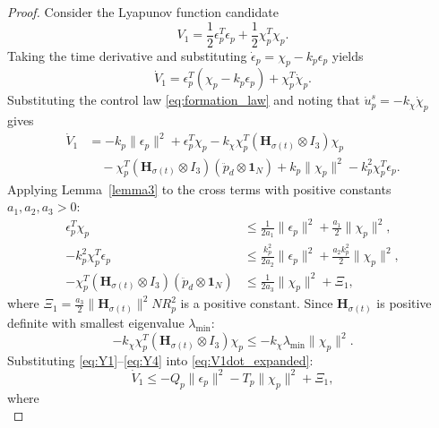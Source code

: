 \begin{proof}
Consider the Lyapunov function candidate
\begin{equation}
    V_1 = \frac{1}{2} \epsilon_p^T \epsilon_p + \frac{1}{2} \chi_p^T \chi_p.
    \label{eq:V1}
\end{equation}
Taking the time derivative and substituting $\dot{\epsilon}_p = \chi_p - k_p
\epsilon_p$ yields
\begin{equation}
    \dot{V}_1 = \epsilon_p^T(\chi_p - k_p \epsilon_p) + \chi_p^T \dot{\chi}_p.
\end{equation}
Substituting the control law \eqref{eq:formation_law} and noting that
$\dot{u}_p^s = -k_\chi \dot{\chi}_p$ gives
\begin{align}
    \dot{V}_1 &= -k_p \|\epsilon_p\|^2 + \epsilon_p^T \chi_p
    - k_\chi \chi_p^T (\mathbf{H}_{\sigma(t)} \otimes I_3) \chi_p \nonumber \\
    &\quad - \chi_p^T (\mathbf{H}_{\sigma(t)} \otimes I_3)
    (\ddot{p}_d \otimes \mathbf{1}_N)
    + k_p \|\chi_p\|^2 - k_p^2 \chi_p^T \epsilon_p.
    \label{eq:V1dot_expanded}
\end{align}
Applying Lemma~\ref{lemma3} to the cross terms with positive constants
$a_1, a_2, a_3 > 0$:
\begin{align}
    \epsilon_p^T \chi_p &\leq \frac{1}{2a_1}\|\epsilon_p\|^2
    + \frac{a_1}{2}\|\chi_p\|^2, \label{eq:Y1}\\
    -k_p^2 \chi_p^T \epsilon_p &\leq \frac{k_p^2}{2a_2}\|\epsilon_p\|^2
    + \frac{a_2 k_p^2}{2}\|\chi_p\|^2, \label{eq:Y2}\\
    -\chi_p^T (\mathbf{H}_{\sigma(t)} \otimes I_3)(\ddot{p}_d \otimes
    \mathbf{1}_N) &\leq \frac{1}{2a_3}\|\chi_p\|^2 + \Xi_1,
    \label{eq:Y3}
\end{align}
where $\Xi_1 = \frac{a_3}{2}\|\mathbf{H}_{\sigma(t)}\|^2 N R_p^2$ is a
positive constant. Since $\mathbf{H}_{\sigma(t)}$ is positive definite with
smallest eigenvalue $\lambda_{\min}$:
\begin{equation}
    -k_\chi \chi_p^T (\mathbf{H}_{\sigma(t)} \otimes I_3) \chi_p
    \leq -k_\chi \lambda_{\min} \|\chi_p\|^2.
    \label{eq:Y4}
\end{equation}
Substituting \eqref{eq:Y1}--\eqref{eq:Y4} into \eqref{eq:V1dot_expanded}:
\begin{equation}
    \dot{V}_1 \leq -Q_p \|\epsilon_p\|^2 - T_p \|\chi_p\|^2 + \Xi_1,
    \label{eq:V1dot_final}
\end{equation}
where
\begin{equation}

\end{equation}
\end{proof}
